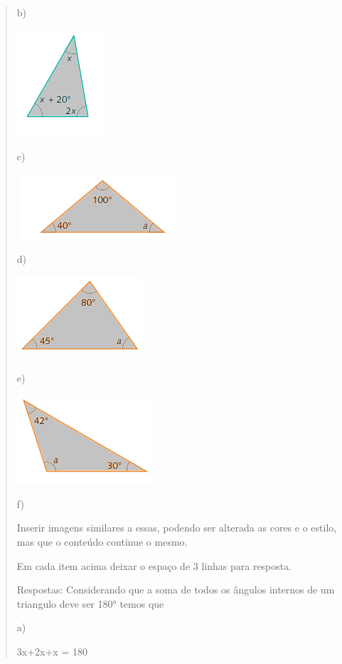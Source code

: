 \begin{quote}
\begin{escolha}
b)

\includegraphics[width=1.30208in,height=1.5625in]{./imgSAEB_8_MAT/media/image26.png}

c)

\includegraphics[width=2.33333in,height=0.95833in]{./imgSAEB_8_MAT/media/image27.png}

d)

\includegraphics[width=1.83333in,height=1.1875in]{./imgSAEB_8_MAT/media/image28.png}

e)

\includegraphics[width=2in,height=1.30208in]{./imgSAEB_8_MAT/media/image29.png}

f)

Inserir imagens similares a essas, podendo ser alterada as cores e o
estilo, mas que o conteúdo continue o mesmo.

Em cada item acima deixar o espaço de 3 linhas para resposta.

Respostas: Considerando que a soma de todos os ângulos internos de um
triangulo deve ser 180° temos que

a)

3x+2x+x = 180


\end{escolha}
\end{quote}
